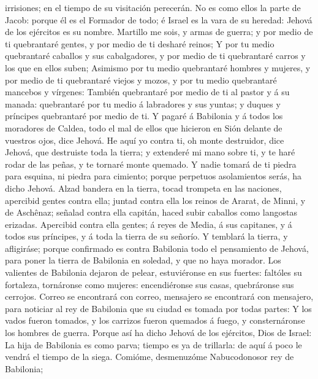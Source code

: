 irrisiones; en el tiempo de su visitación perecerán.  No
es como ellos la parte de Jacob: porque él es el Formador de todo; é
Israel es la vara de su heredad: Jehová de los ejércitos es su nombre.
 Martillo me sois, y armas de guerra; y por medio de ti
quebrantaré gentes, y por medio de ti desharé reinos;  Y
por tu medio quebrantaré caballos y sus cabalgadores, y por medio de ti
quebrantaré carros y los que en ellos suben;  Asimismo
por tu medio quebrantaré hombres y mujeres, y por medio de ti
quebrantaré viejos y mozos, y por tu medio quebrantaré mancebos y
vírgenes:  También quebrantaré por medio de ti al pastor
y á su manada: quebrantaré por tu medio á labradores y sus yuntas; y
duques y príncipes quebrantaré por medio de ti.  Y pagaré
á Babilonia y á todos los moradores de Caldea, todo el mal de ellos que
hicieron en Sión delante de vuestros ojos, dice Jehová. 
He aquí yo contra ti, oh monte destruidor, dice Jehová, que destruiste
toda la tierra; y extenderé mi mano sobre ti, y te haré rodar de las
peñas, y te tornaré monte quemado.  Y nadie tomará de ti
piedra para esquina, ni piedra para cimiento; porque perpetuos
asolamientos serás, ha dicho Jehová.  Alzad bandera en la
tierra, tocad trompeta en las naciones, apercibid gentes contra ella;
juntad contra ella los reinos de Ararat, de Minni, y de Aschênaz;
señalad contra ella capitán, haced subir caballos como langostas
erizadas.  Apercibid contra ella gentes; á reyes de
Media, á sus capitanes, y á todos sus príncipes, y á toda la tierra de
su señorío.  Y temblará la tierra, y afligiráse; porque
confirmado es contra Babilonia todo el pensamiento de Jehová, para poner
la tierra de Babilonia en soledad, y que no haya morador.
 Los valientes de Babilonia dejaron de pelear,
estuviéronse en sus fuertes: faltóles su fortaleza, tornáronse como
mujeres: encendiéronse sus casas, quebráronse sus cerrojos.
 Correo se encontrará con correo, mensajero se encontrará
con mensajero, para noticiar al rey de Babilonia que su ciudad es tomada
por todas partes:  Y los vados fueron tomados, y los
carrizos fueron quemados á fuego, y consternáronse los hombres de
guerra.  Porque así ha dicho Jehová de los ejércitos,
Dios de Israel: La hija de Babilonia es como parva; tiempo es ya de
trillarla: de aquí á poco le vendrá el tiempo de la siega.
 Comióme, desmenuzóme Nabucodonosor rey de Babilonia;
